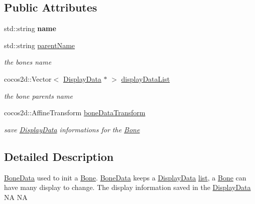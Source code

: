\subsection*{Public Attributes}
\begin{DoxyCompactItemize}
\item 
\mbox{\label{classcocostudio_1_1BoneData_a30a4ceebb3bd7dd024e9d96132b4db69}} 
std\+::string {\bfseries name}
\item 
\mbox{\label{classcocostudio_1_1BoneData_a7d6cbb415ed8756e3967eff28b6beb55}} 
std\+::string \hyperlink{classcocostudio_1_1BoneData_a7d6cbb415ed8756e3967eff28b6beb55}{parent\+Name}
\begin{DoxyCompactList}\small\item\em the bone\textquotesingle{}s name \end{DoxyCompactList}\item 
\mbox{\label{classcocostudio_1_1BoneData_ad73d2e4bb2f7b195b21c75e4c56e9850}} 
cocos2d\+::\+Vector$<$ \hyperlink{classcocostudio_1_1DisplayData}{Display\+Data} $\ast$ $>$ \hyperlink{classcocostudio_1_1BoneData_ad73d2e4bb2f7b195b21c75e4c56e9850}{display\+Data\+List}
\begin{DoxyCompactList}\small\item\em the bone parent\textquotesingle{}s name \end{DoxyCompactList}\item 
\mbox{\label{classcocostudio_1_1BoneData_ad60e986917359120795ff112214cf835}} 
cocos2d\+::\+Affine\+Transform \hyperlink{classcocostudio_1_1BoneData_ad60e986917359120795ff112214cf835}{bone\+Data\+Transform}
\begin{DoxyCompactList}\small\item\em save \hyperlink{classcocostudio_1_1DisplayData}{Display\+Data} informations for the \hyperlink{classcocostudio_1_1Bone}{Bone} \end{DoxyCompactList}\end{DoxyCompactItemize}


\subsection{Detailed Description}
\hyperlink{classcocostudio_1_1BoneData}{Bone\+Data} used to init a \hyperlink{classcocostudio_1_1Bone}{Bone}. \hyperlink{classcocostudio_1_1BoneData}{Bone\+Data} keeps a \hyperlink{classcocostudio_1_1DisplayData}{Display\+Data} \hyperlink{protocollist-p}{list}, a \hyperlink{classcocostudio_1_1Bone}{Bone} can have many display to change. The display information saved in the \hyperlink{classcocostudio_1_1DisplayData}{Display\+Data}  NA  NA 

